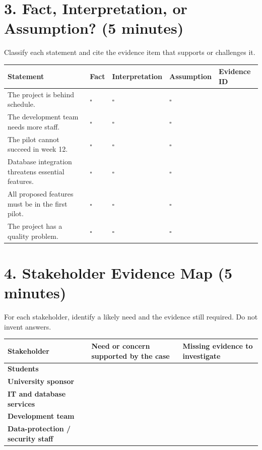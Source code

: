 \documentclass[11pt,a4paper]{article}
\begin{document}
\section{3. Fact, Interpretation, or Assumption? (5 minutes)}

Classify each statement and cite the evidence item that supports or challenges it.

\begin{center}
\small
\begin{tabularx}{\textwidth}{Y >{\centering\arraybackslash}p{1.6cm} >{\centering\arraybackslash}p{1.8cm} >{\centering\arraybackslash}p{1.8cm} p{2.2cm}}
\toprule
Statement & Fact & Interpretation & Assumption & Evidence ID \\
\midrule
The project is behind schedule. & $\square$ & $\square$ & $\square$ & \\[5mm]
The development team needs more staff. & $\square$ & $\square$ & $\square$ & \\[5mm]
The pilot cannot succeed in week 12. & $\square$ & $\square$ & $\square$ & \\[5mm]
Database integration threatens essential features. & $\square$ & $\square$ & $\square$ & \\[5mm]
All proposed features must be in the first pilot. & $\square$ & $\square$ & $\square$ & \\[5mm]
The project has a quality problem. & $\square$ & $\square$ & $\square$ & \\
\bottomrule
\end{tabularx}
\end{center}

\section{4. Stakeholder Evidence Map (5 minutes)}

For each stakeholder, identify a likely need and the evidence still required. Do not invent answers.

\begin{center}
\small
\begin{tabularx}{\textwidth}{>{\bfseries}p{3cm} Y Y}
\toprule
Stakeholder & Need or concern supported by the case & Missing evidence to investigate \\
\midrule
Students & & \\[7mm]
University sponsor & & \\[7mm]
IT and database services & & \\[7mm]
Development team & & \\[7mm]
Data-protection / security staff & & \\
\bottomrule
\end{tabularx}
\end{center}
\end{document}
